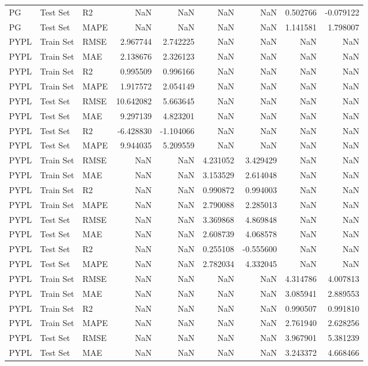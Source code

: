 \begin{tabular}{lllrrrrrr}
PG & Test Set & R2 & NaN & NaN & NaN & NaN & 0.502766 & -0.079122 \\
PG & Test Set & MAPE & NaN & NaN & NaN & NaN & 1.141581 & 1.798007 \\
PYPL & Train Set & RMSE & 2.967744 & 2.742225 & NaN & NaN & NaN & NaN \\
PYPL & Train Set & MAE & 2.138676 & 2.326123 & NaN & NaN & NaN & NaN \\
PYPL & Train Set & R2 & 0.995509 & 0.996166 & NaN & NaN & NaN & NaN \\
PYPL & Train Set & MAPE & 1.917572 & 2.054149 & NaN & NaN & NaN & NaN \\
PYPL & Test Set & RMSE & 10.642082 & 5.663645 & NaN & NaN & NaN & NaN \\
PYPL & Test Set & MAE & 9.297139 & 4.823201 & NaN & NaN & NaN & NaN \\
PYPL & Test Set & R2 & -6.428830 & -1.104066 & NaN & NaN & NaN & NaN \\
PYPL & Test Set & MAPE & 9.944035 & 5.209559 & NaN & NaN & NaN & NaN \\
PYPL & Train Set & RMSE & NaN & NaN & 4.231052 & 3.429429 & NaN & NaN \\
PYPL & Train Set & MAE & NaN & NaN & 3.153529 & 2.614048 & NaN & NaN \\
PYPL & Train Set & R2 & NaN & NaN & 0.990872 & 0.994003 & NaN & NaN \\
PYPL & Train Set & MAPE & NaN & NaN & 2.790088 & 2.285013 & NaN & NaN \\
PYPL & Test Set & RMSE & NaN & NaN & 3.369868 & 4.869848 & NaN & NaN \\
PYPL & Test Set & MAE & NaN & NaN & 2.608739 & 4.068578 & NaN & NaN \\
PYPL & Test Set & R2 & NaN & NaN & 0.255108 & -0.555600 & NaN & NaN \\
PYPL & Test Set & MAPE & NaN & NaN & 2.782034 & 4.332045 & NaN & NaN \\
PYPL & Train Set & RMSE & NaN & NaN & NaN & NaN & 4.314786 & 4.007813 \\
PYPL & Train Set & MAE & NaN & NaN & NaN & NaN & 3.085941 & 2.889553 \\
PYPL & Train Set & R2 & NaN & NaN & NaN & NaN & 0.990507 & 0.991810 \\
PYPL & Train Set & MAPE & NaN & NaN & NaN & NaN & 2.761940 & 2.628256 \\
PYPL & Test Set & RMSE & NaN & NaN & NaN & NaN & 3.967901 & 5.381239 \\
PYPL & Test Set & MAE & NaN & NaN & NaN & NaN & 3.243372 & 4.668466 \\

\end{tabular}
